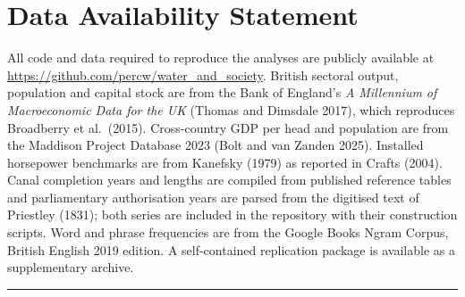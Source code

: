 \documentclass[
  11pt,
]{article}
\begin{document}
\section{Data Availability Statement}\label{data-availability-statement}

All code and data required to reproduce the analyses are publicly
available at \url{https://github.com/percw/water_and_society}. British
sectoral output, population and capital stock are from the Bank of
England's \emph{A Millennium of Macroeconomic Data for the UK} (Thomas
and Dimsdale 2017), which reproduces Broadberry et al.~(2015).
Cross-country GDP per head and population are from the Maddison Project
Database 2023 (Bolt and van Zanden 2025). Installed horsepower
benchmarks are from Kanefsky (1979) as reported in Crafts (2004). Canal
completion years and lengths are compiled from published reference
tables and parliamentary authorisation years are parsed from the
digitised text of Priestley (1831); both series are included in the
repository with their construction scripts. Word and phrase frequencies
are from the Google Books Ngram Corpus, British English 2019 edition. A
self-contained replication package is available as a supplementary
archive.

\begin{center}\rule{0.5\linewidth}{0.5pt}\end{center}
\end{document}
